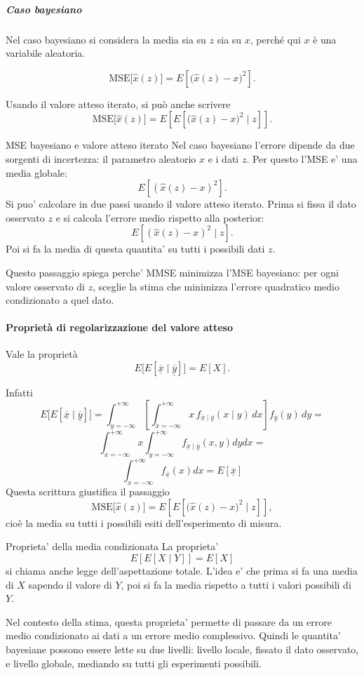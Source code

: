 \documentclass[11pt,a4paper]{article}
\begin{document}
\subparagraph*{Caso bayesiano}
Nel caso bayesiano si considera la media sia su \(z\) sia su \(x\), perché qui \(x\) è una variabile aleatoria.

\[
\mathrm{MSE}\bigl[\hat x(z)\bigr]
=
E\!\left[
\bigl(\hat x(z)-x\bigr)^2
\right].
\]

Usando il valore atteso iterato, si può anche scrivere
\[
\mathrm{MSE}\bigl[\hat x(z)\bigr]
=
E\!\left[
E\!\left[
\bigl(\hat x(z)-x\bigr)^2 \mid z
\right]
\right].
\]

\begin{spiegazione}{MSE bayesiano e valore atteso iterato}
Nel caso bayesiano l'errore dipende da due sorgenti di incertezza: il parametro aleatorio $x$ e i dati $z$. Per questo l'MSE e' una media globale:
\[
E[(\hat x(z)-x)^2].
\]
Si puo' calcolare in due passi usando il valore atteso iterato. Prima si fissa il dato osservato $z$ e si calcola l'errore medio rispetto alla posterior:
\[
E[(\hat x(z)-x)^2\mid z].
\]
Poi si fa la media di questa quantita' su tutti i possibili dati $z$.

Questo passaggio spiega perche' MMSE minimizza l'MSE bayesiano: per ogni valore osservato di $z$, sceglie la stima che minimizza l'errore quadratico medio condizionato a quel dato.
\end{spiegazione}

\paragraph{Proprietà di regolarizzazione del valore atteso}
Vale la proprietà
\[
E\!\bigl[E[\overline{\underline{x}}\mid \overline{\underline{y}}]\bigr]=E[X].
\]

Infatti
\[
E\!\bigl[E[\overline{\underline{x}}\mid \overline{\underline{y}}]\bigr]
=
\int_{y=-\infty}^{+\infty}
\left[
\int_{x=-\infty}^{+\infty}
x\,f_{\overline{\underline{x}}\mid \overline{\underline{y}}}(x\mid y)\,dx
\right]
f_{\overline{\underline{y}}}(y)\,dy = 
\]
\[
\int_{x=-\infty}^{+\infty}x\int_{y=-\infty}^{+\infty}f_{\overline{\underline{x}}\mid \overline{\underline{y}}}(x,y)dydx =
\]
\[
\int_{x=-\infty}^{+\infty} f_{\overline{\underline{x}}}(x) dx = E[\overline{\underline{x}}]
\]
Questa scrittura giustifica il passaggio
\[
\mathrm{MSE}\bigl[\hat x(z)\bigr]
=
E\!\left[
E\!\left[
\bigl(\hat x(z)-x\bigr)^2 \mid z
\right]
\right],
\]
cioè la media su tutti i possibili esiti dell'esperimento di misura.

\begin{spiegazione}{Proprieta' della media condizionata}
La proprieta'
\[
E[E[X\mid Y]]=E[X]
\]
si chiama anche legge dell'aspettazione totale. L'idea e' che prima si fa una media di $X$ sapendo il valore di $Y$, poi si fa la media rispetto a tutti i valori possibili di $Y$.

Nel contesto della stima, questa proprieta' permette di passare da un errore medio condizionato ai dati a un errore medio complessivo. Quindi le quantita' bayesiane possono essere lette su due livelli: livello locale, fissato il dato osservato, e livello globale, mediando su tutti gli esperimenti possibili.
\end{spiegazione}
\end{document}

